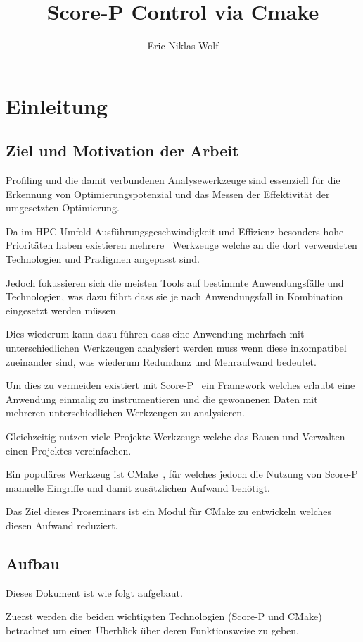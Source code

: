 \documentclass[german,proseminar,hyperref,utf8,lof]{zihpub}
\author{Eric Niklas Wolf}
\title{Score-P Control via Cmake}
\begin{document}
    \section{Einleitung}
    \subsection{Ziel und Motivation der Arbeit}
    Profiling und die damit verbundenen Analysewerkzeuge sind essenziell für die Erkennung von
    Optimierungspotenzial und das Messen der Effektivität der umgesetzten Optimierung.

    Da im HPC Umfeld Ausführungsgeschwindigkeit und Effizienz besonders hohe Prioritäten haben existieren
    mehrere~ Werkzeuge welche an die dort verwendeten Technologien
    und Pradigmen angepasst sind.

    Jedoch fokussieren sich die meisten Tools auf bestimmte Anwendungsfälle und Technologien,
    was dazu führt dass sie je nach Anwendungsfall in Kombination eingesetzt werden müssen.

    Dies wiederum kann dazu führen dass eine Anwendung mehrfach mit unterschiedlichen Werkzeugen
    analysiert werden muss wenn diese inkompatibel zueinander sind, was wiederum Redundanz
    und Mehraufwand bedeutet.

    Um dies zu vermeiden existiert mit Score-P~\cite{Score-P-Paper} ein Framework welches erlaubt
    eine Anwendung  einmalig zu instrumentieren und die gewonnenen Daten mit mehreren
    unterschiedlichen Werkzeugen zu analysieren.

    Gleichzeitig nutzen viele Projekte Werkzeuge welche das Bauen und Verwalten einen Projektes
    vereinfachen.

    Ein populäres Werkzeug ist CMake~\cite{CMake-Documentation}, für welches jedoch die Nutzung
    von Score-P manuelle Eingriffe und damit zusätzlichen Aufwand benötigt.

    Das Ziel dieses Proseminars ist ein Modul für CMake zu entwickeln welches diesen Aufwand
    reduziert.


    \subsection{Aufbau}
    Dieses Dokument ist wie folgt aufgebaut.

    Zuerst werden die beiden wichtigsten Technologien (Score-P und CMake) betrachtet um einen
    Überblick über deren Funktionsweise zu geben.
\end{document}
